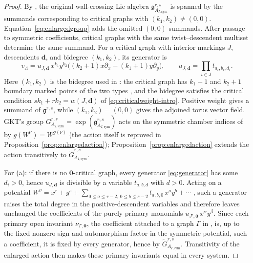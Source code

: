 \documentclass[11pt]{amsart}
\theoremstyle{definition}
\theoremstyle{remark}
\newcommand{\gfrak}{\mathfrak{g}}
\begin{document}
\begin{proof}
By \cite[Definition~4.23]{GKT}, the original wall-crossing Lie algebra
$\gfrak^{r,s}_{A_{I,\mathrm{sym}}}$ is spanned by the summands
corresponding to critical graphs with $(k_{1},k_{2})\ne(0,0)$.
Equation~\eqref{eq:enlargedgroup} adds the omitted $(0,0)$ summands. After passage
to symmetric coefficients, critical graphs with the same twist--descendent
multiset determine the same summand. For a critical graph with interior
markings $J$, descendents $\mathbf d$, and bidegree
$(k_{1},k_{2})$, its generator is
\begin{equation}
\label{eq:generator}
v_{\Lambda}=u_{J,\mathbf d}\,x^{k_{1}}y^{k_{2}}
\bigl((k_{2}+1)x\partial_{x}-(k_{1}+1)y\partial_{y}\bigr),\qquad
u_{J,\mathbf d}=\prod_{i\in J}t_{a_{i},b_{i},d_{i}} .
\end{equation}
Here $(k_{1},k_{2})$ is the bidegree used in
\cite[Definition~4.23]{GKT}: the critical graph has $k_{1}{+}1$ and
$k_{2}{+}1$ boundary marked points of the two types
\cite[eqn.~(2.31), Proposition~2.39]{GKT}, and
the bidegree satisfies the critical condition
$sk_{1}+rk_{2}=w(J,\mathbf d)$ of \eqref{eq:criticalweight-intro}. Positive
weight gives a summand of $\gfrak^{r,s}$, while $(k_{1},k_{2})=(0,0)$ gives the
adjoined torus vector field. GKT's group
$G^{r,s}_{A_{I,\mathrm{sym}}}=\exp(\gfrak^{r,s}_{A_{I,\mathrm{sym}}})$ acts on
the symmetric chamber indices of \cite[Definition~3.47]{GKT} by
$g(W^{\nu})=W^{g(\nu)}$ \cite[Theorem~4.27]{GKT} (the action itself is
reproved in Proposition~\ref{prop:enlargedaction});
Proposition~\ref{prop:enlargedaction} extends the action transitively to
$\widetilde G^{r,s}_{A_{I,\mathrm{sym}}}$.

For (a): if there is no $\mathbf0$-critical graph, every generator
\eqref{eq:generator} has some $d_{i}>0$, hence $u_{J,\mathbf d}$ is divisible by
a variable $t_{a,b,d}$ with $d>0$. Acting on a potential
$W^{\nu}=x^{r}+y^{s}+\sum_{0\le a\le r-2,\ 0\le b\le s-2}t_{a,b,0}\,x^{a}y^{b}+\cdots$
\cite[eqn.~(0.5)]{GKT}, such a generator raises the total degree in the
positive-descendent variables and therefore leaves unchanged the coefficients of
the purely primary monomials $u_{J',\mathbf 0}\,x^{\alpha}y^{\beta}$. Since
each primary open invariant $\nu_{\Gamma,\mathbf 0}$, the coefficient attached
to a graph $\Gamma$ in \cite[eqns.~(0.4)--(0.5)]{GKT}, is, up to the fixed
nonzero sign and automorphism factor in the symmetric potential, such a
coefficient, it is fixed by every generator, hence by
$\widetilde G^{r,s}_{A_{I,\mathrm{sym}}}$. Transitivity of the enlarged action
then makes these primary invariants equal in every system.


\end{proof}
\end{document}
